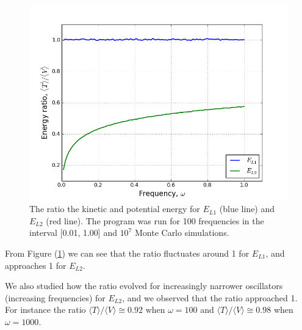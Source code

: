 \documentclass[norsk,a4paper,12pt]{article}
\begin{document}
\begin{figure} [H]
    \centering
    \includegraphics[width=12cm]{energy_ratio_1e7.png}
    \caption{The ratio the kinetic and potential energy for $E_{L1}$ (blue line) and $E_{L2}$ (red line). The program was run for 100 frequencies in the interval [0.01, 1.00] and $10^7$ Monte Carlo simulations.}
    \label{fig:ratio}
\end{figure}
From Figure (\ref{fig:ratio}) we can see that the ratio fluctuates around 1 for $E_{L1}$, and approaches 1 for $E_{L2}$.

We also studied how the ratio evolved for increasingly narrower oscillators (increasing frequencies) for $E_{L2}$, and we observed that the ratio approached 1. For instance the ratio $\langle T\rangle/\langle V\rangle\cong0.92$ when $\omega=100$ and $\langle T\rangle/\langle V\rangle\cong0.98$ when $\omega=1000$.
\end{document}
